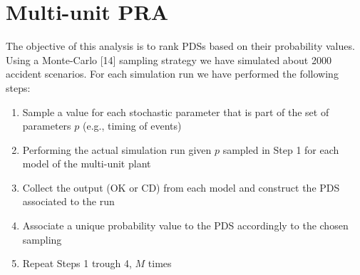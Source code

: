 \section{Multi-unit PRA}
\label{sec:multiUnitPRA}

The objective of this analysis is to rank PDSs based on their probability values.
Using a Monte-Carlo [14] sampling strategy we have simulated about 2000 accident scenarios. 
For each simulation run we have performed the following steps:
\begin{enumerate}
  \item Sample a value for each stochastic parameter that is part of the set of parameters $p$ (e.g., timing of events)
  \item Performing the actual simulation run given $p$ sampled in Step 1 for each model of the multi-unit plant
  \item Collect the output (OK or CD) from each model and construct the PDS associated to the run
  \item Associate a unique probability value to the PDS accordingly to the chosen sampling
  \item Repeat Steps 1 trough 4, $M$ times 
\end{enumerate}